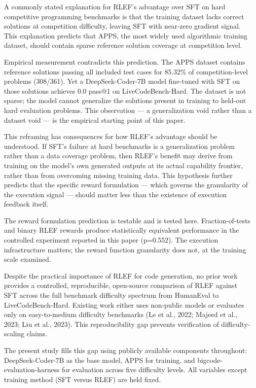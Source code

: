 
A commonly stated explanation for RLEF's advantage over SFT on hard competitive programming benchmarks is that the training dataset lacks correct solutions at competition difficulty, leaving SFT with near-zero gradient signal. This explanation predicts that APPS, the most widely used algorithmic training dataset, should contain sparse reference solution coverage at competition level.

Empirical measurement contradicts this prediction. The APPS dataset contains reference solutions passing all included test cases for 85.32\% of competition-level problems (308/361). Yet a DeepSeek-Coder-7B model fine-tuned with SFT on those solutions achieves 0.0 pass@1 on LiveCodeBench-Hard. The dataset is not sparse; the model cannot generalize the solutions present in training to held-out hard evaluation problems. This observation --- a generalization void rather than a dataset void --- is the empirical starting point of this paper.

This reframing has consequences for how RLEF's advantage should be understood. If SFT's failure at hard benchmarks is a generalization problem rather than a data coverage problem, then RLEF's benefit may derive from training on the model's own generated outputs at its actual capability frontier, rather than from overcoming missing training data. This hypothesis further predicts that the specific reward formulation --- which governs the granularity of the execution signal --- should matter less than the existence of execution feedback itself.

The reward formulation prediction is testable and is tested here. Fraction-of-tests and binary RLEF rewards produce statistically equivalent performance in the controlled experiment reported in this paper (p=0.552). The execution infrastructure matters; the reward function granularity does not, at the training scale examined.

Despite the practical importance of RLEF for code generation, no prior work provides a controlled, reproducible, open-source comparison of RLEF against SFT across the full benchmark difficulty spectrum from HumanEval to LiveCodeBench-Hard. Existing work either uses non-public models \citep{Gehring2024RLEF} or evaluates only on easy-to-medium difficulty benchmarks (Le et al., 2022; Majeed et al., 2023; Liu et al., 2023). This reproducibility gap prevents verification of difficulty-scaling claims.

The present study fills this gap using publicly available components throughout: DeepSeek-Coder-7B as the base model, APPS for training, and bigcode-evaluation-harness for evaluation across five difficulty levels. All variables except training method (SFT versus RLEF) are held fixed.

